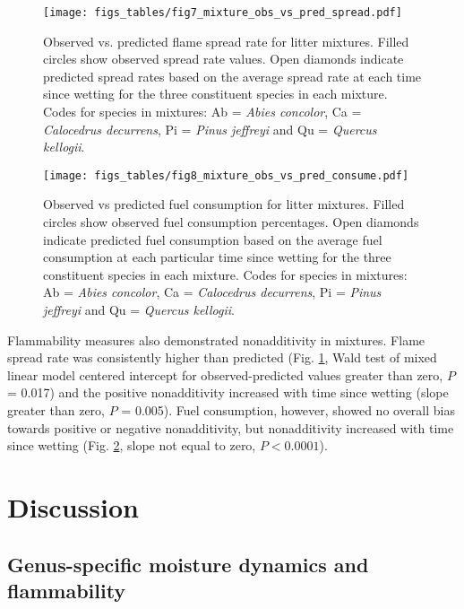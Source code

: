 \documentclass[letterpaper,12pt]{article}
\begin{document}
\begin{figure}[h]
  \centering
\texttt{[image: figs\_tables/fig7\_mixture\_obs\_vs\_pred\_spread.pdf]}
\caption{Observed vs. predicted flame spread rate for litter mixtures. Filled
  circles show observed spread rate values. Open diamonds indicate predicted
  spread rates based on the average spread rate at each time since wetting for
  the three constituent species in each mixture. Codes for species in mixtures:
  Ab = \emph{Abies concolor}, Ca = \emph{Calocedrus decurrens}, Pi =
  \emph{Pinus jeffreyi} and Qu = \emph{Quercus kellogii}.}
  \label{fig:mixture_obs_pred_spread}
\end{figure}


\begin{figure}[h]
  \centering
\texttt{[image: figs\_tables/fig8\_mixture\_obs\_vs\_pred\_consume.pdf]}
\caption{Observed vs predicted fuel consumption for litter mixtures. Filled
  circles show observed fuel consumption percentages. Open diamonds indicate
  predicted fuel consumption based on the average fuel consumption at each
  particular time since wetting for the three constituent species in each
  mixture. Codes for species in mixtures: Ab = \emph{Abies concolor}, Ca =
  \emph{Calocedrus decurrens}, Pi = \emph{Pinus jeffreyi} and Qu =
  \emph{Quercus kellogii}.}
  \label{fig:mixture_obs_pred_consume}
\end{figure}


Flammability measures also demonstrated nonadditivity in mixtures. Flame
spread rate was consistently higher than predicted (Fig.
\ref{fig:mixture_obs_pred_spread}, Wald test of mixed linear model centered
intercept for observed-predicted values greater than zero, $P$ = 0.017) and the
positive nonadditivity increased with time since wetting (slope greater than
zero, $P$ = 0.005). Fuel consumption, however, showed no overall bias towards
positive or negative nonadditivity, but nonadditivity increased with time
since wetting (Fig. \ref{fig:mixture_obs_pred_consume}, slope not equal to
zero, $P < 0.0001$).

\section*{Discussion}

\subsection*{Genus-specific moisture dynamics and flammability}
\end{document}
